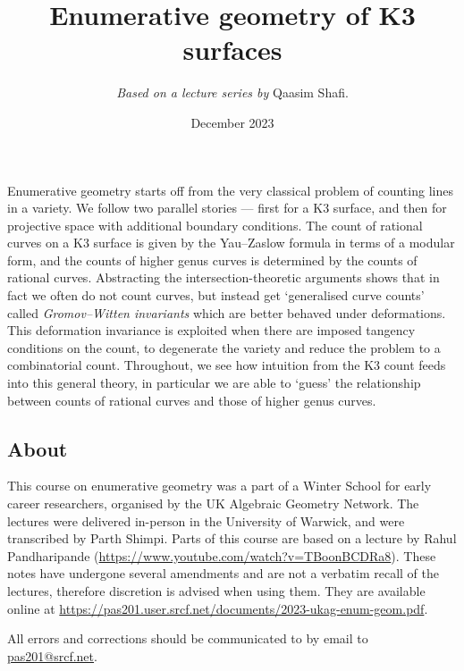 \title{Enumerative geometry of K3 surfaces}
\author{\textit{Based on a lecture series by }Qaasim Shafi.}
\date{December 2023}
\maketitle

\newcommand{\Jac}{\mathop{\mathcal{J\kern -0.5pt a\kern -0.5pt c\kern -1pt}}}
\newcommand{\IJac}{\mathop{I\mathcal{J\kern -0.5pt a\kern -0.5pt c\kern -1pt}}}
\newcommand{\Moduli}{\ensuremath{\mathscr{M}}}

Enumerative geometry starts off from the very classical problem of counting
lines in a variety. We follow two parallel stories --- first for a K3 surface, and
then for projective space with additional boundary conditions. The count of
rational curves on a K3 surface is given by the Yau--Zaslow formula in terms of
a modular form, and the counts of higher genus curves is determined by the
counts of rational curves. Abstracting the intersection-theoretic arguments
shows that in fact we often do not count curves, but instead get `generalised
curve counts' called \textit{Gromov--Witten invariants} which are better behaved
under deformations. This deformation invariance is exploited when there are
imposed tangency conditions on the count, to degenerate the variety and reduce
the problem to a combinatorial count. Throughout, we see how intuition from
the K3 count feeds into this general theory, in particular we are able to
`guess' the relationship between counts of rational curves and those of higher
genus curves.

\subsection{About} This course on enumerative geometry was a part of a Winter
School for early career researchers, organised by the UK Algebraic
Geometry Network. The lectures were delivered in-person in the University of
Warwick, and were transcribed by Parth Shimpi. 
Parts of this course are based on a lecture by Rahul Pandharipande
(\url{https://www.youtube.com/watch?v=TBoonBCDRa8}). These notes have undergone
several amendments and are not a verbatim recall of the lectures, therefore
discretion is advised when using them. They are available online at
\url{https://pas201.user.srcf.net/documents/2023-ukag-enum-geom.pdf}.

All errors and corrections should be communicated to by email to
\url{pas201@srcf.net}.


